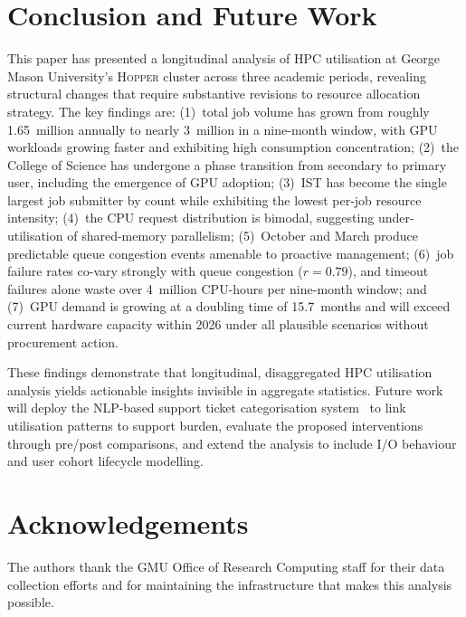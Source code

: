 \documentclass[11pt,letterpaper]{article}
\newcommand{\hopper}{\textsc{Hopper}}
\newcommand{\gmu}{GMU}
\begin{document}
\section{Conclusion and Future Work}
\label{sec:conclusion}

This paper has presented a longitudinal analysis of HPC utilisation at George
Mason University's \hopper{} cluster across three academic periods, revealing
structural changes that require substantive revisions to resource allocation
strategy.  The key findings are: (1)~total job volume has grown from roughly
1.65~million annually to nearly 3~million in a nine-month window, with GPU
workloads growing faster and exhibiting high consumption concentration;
(2)~the College of Science has undergone a phase transition from secondary to
primary user, including the emergence of GPU adoption; (3)~IST has become the
single largest job submitter by count while exhibiting the lowest per-job
resource intensity; (4)~the CPU request distribution is bimodal, suggesting
under-utilisation of shared-memory parallelism; (5)~October and March produce
predictable queue congestion events amenable to proactive management;
(6)~job failure rates co-vary strongly with queue congestion ($r = 0.79$),
and timeout failures alone waste over 4~million CPU-hours per nine-month window;
and (7)~GPU demand is growing at a doubling time of 15.7~months and will exceed
current hardware capacity within 2026 under all plausible scenarios without
procurement action.

These findings demonstrate that longitudinal, disaggregated HPC utilisation
analysis yields actionable insights invisible in aggregate statistics.  Future
work will deploy the NLP-based support ticket categorisation system~\citep{orc2025nlp}
to link utilisation patterns to support burden, evaluate the proposed interventions
through pre/post comparisons, and extend the analysis to include I/O behaviour and
user cohort lifecycle modelling.

\section*{Acknowledgements}

The authors thank the \gmu{} Office of Research Computing staff for their data
collection efforts and for maintaining the infrastructure that makes this analysis
possible.



\end{document}
